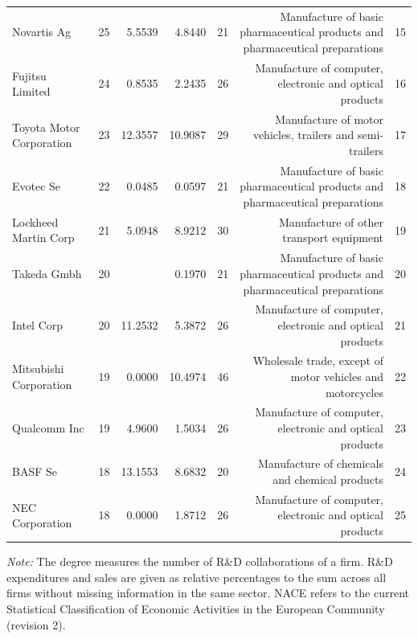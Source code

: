 \begin{table}[tbp]
{\begin{sideways}
\begin{threeparttable}
\begin{tabular}{lrrrrrr}
Novartis Ag & 25 & 5.5539 & 4.8440 & 21 & Manufacture of basic pharmaceutical products and pharmaceutical preparations & 15 \\ 
Fujitsu Limited & 24 & 0.8535 & 2.2435 & 26 & Manufacture of computer, electronic and optical products & 16 \\ 
Toyota Motor Corporation & 23 & 12.3557 & 10.9087 & 29 & Manufacture of motor vehicles, trailers and semi-trailers & 17 \\ 
Evotec Se & 22 & 0.0485 & 0.0597 & 21 & Manufacture of basic pharmaceutical products and pharmaceutical preparations & 18 \\ 
Lockheed Martin Corp & 21 & 5.0948 & 8.9212 & 30 & Manufacture of other transport equipment & 19 \\ 
Takeda Gmbh & 20 &  & 0.1970 & 21 & Manufacture of basic pharmaceutical products and pharmaceutical preparations & 20 \\ 
Intel Corp & 20 & 11.2532 & 5.3872 & 26 & Manufacture of computer, electronic and optical products & 21 \\ 
Mitsubishi Corporation & 19 & 0.0000 & 10.4974 & 46 & Wholesale trade, except of motor vehicles and motorcycles & 22 \\ 
Qualcomm Inc & 19 & 4.9600 & 1.5034 & 26 & Manufacture of computer, electronic and optical products & 23 \\ 
BASF Se & 18 & 13.1553 & 8.6832 & 20 & Manufacture of chemicals and chemical products & 24 \\ 
NEC Corporation & 18 & 0.0000 & 1.8712 & 26 & Manufacture of computer, electronic and optical products & 25 \\ 
\midrule
\bottomrule
    \end{tabular}
    \begin{tablenotes}[flushleft]%
	\item \emph{Note:} The degree measures the number of R\&D collaborations of a firm. R\&D expenditures and sales are given as relative percentages to the sum across all firms without missing information in the same sector. NACE refers to the current Statistical Classification of Economic Activities in the European Community (revision 2).
	\end{tablenotes}
  \label{tab:2020_deg_ranking-nace}%
\end{threeparttable}
\end{sideways}
}
\end{table}

